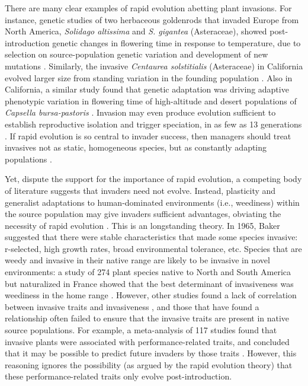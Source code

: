 \documentclass[12pt]{article}\usepackage[]{graphicx}\usepackage[]{color}
\begin{document}
	There are many clear examples of rapid evolution abetting plant invasions. For instance, genetic studies of two herbaceous goldenrods that invaded Europe from North America, \textit{Solidago altissima} and \textit{S. gigantea} (Asteraceae), showed post-introduction genetic changes in flowering time in response to temperature, due to selection on source-population genetic variation and development of new mutations \parencite{Weber1998}. Similarly, the invasive \textit{Centaurea solstitialis} (Asteraceae) in California evolved larger size from standing variation in the founding population \parencite{Barker2017}. Also in California, a similar study found that genetic adaptation was driving adaptive phenotypic variation in flowering time of high-altitude and desert populations of \textit{Capsella bursa-pastoris} \parencite{Linde2001}. Invasion may even produce evolution sufficient to establish reproductive isolation and trigger speciation, in as few as 13 generations \parencite{Hendry2000}. If rapid evolution is so central to invader success, then managers should treat invasives not as static, homogeneous species, but as constantly adapting populations \parencite{Lee2002invasion}. 
	
	Yet, dispute the support for the importance of rapid evolution, a competing body of literature suggests that invaders need not evolve. Instead,  plasticity and generalist adaptations to human-dominated environments (i.e., weediness) within the source population may give invaders sufficient advantages, obviating the necessity of rapid evolution \parencite{Richards2006,Schwartz1994,Bock2015,Rejmanek1996}. This is an longstanding theory. In 1965, Baker suggested that there were stable characteristics that made some species invasive: r-selected, high growth rates, broad environmental tolerance, etc. Species that are weedy and invasive in their native range are likely to be invasive in novel environments: a study of 274 plant species native to North and South America but naturalized in France showed that the best determinant of invasiveness was weediness in the home range \parencite{Maillet2000}. However, other studies found a lack of correlation between invasive traits and invasiveness \parencite{Perrins1992,Mack1996}, and those that have found a relationship often failed to ensure that the invasive traits are present in native source populations. For example, a meta-analysis of 117 studies found that invasive plants were associated with performance-related traits, and concluded that it may be possible to predict future invaders by those traits \parencite{VanKleunen2010}. However, this reasoning ignores the possibility (as argued by the rapid evolution theory) that these performance-related traits only evolve post-introduction.  
	
\end{document}
